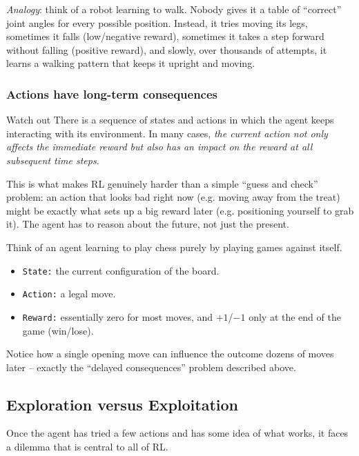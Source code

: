 \textit{Analogy}: think of a robot learning to walk. Nobody gives it a table of
``correct'' joint angles for every possible position. Instead, it tries moving its
legs, sometimes it falls (low/negative reward), sometimes it takes a step forward
without falling (positive reward), and slowly, over thousands of attempts, it
learns a walking pattern that keeps it upright and moving.

\subsubsection{Actions have long-term consequences}

\begin{noteboxtitle}{Watch out}
There is a sequence of states and actions in which the agent keeps interacting
with its environment. In many cases, \textit{the current action not only affects
the immediate reward but also has an impact on the reward at all subsequent time
steps.}
\end{noteboxtitle}

This is what makes RL genuinely harder than a simple ``guess and check'' problem:
an action that looks bad right now (e.g. moving away from the treat) might be
exactly what sets up a big reward later (e.g. positioning yourself to grab it).
The agent has to reason about the future, not just the present.

\vs
\begin{example}
Think of an agent learning to play chess purely by playing games against itself.
\begin{itemize}
  \item \texttt{State:} the current configuration of the board.
  \item \texttt{Action:} a legal move.
  \item \texttt{Reward:} essentially zero for most moves, and $+1$/$-1$ only at
        the end of the game (win/lose).
\end{itemize}
Notice how a single opening move can influence the outcome dozens of moves later --
exactly the ``delayed consequences'' problem described above.
\end{example}

\subsection{Exploration versus Exploitation}\label{sec:rl-intro-exploration-exploitation}

Once the agent has tried a few actions and has some idea of what works, it faces a
dilemma that is central to all of RL.


